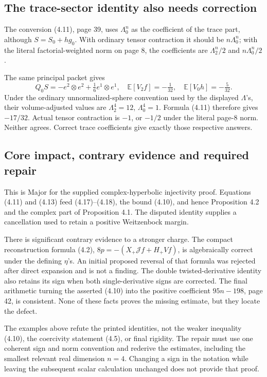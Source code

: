 \documentclass[10pt]{article}
\begin{document}
\subsection*{The trace-sector identity also needs correction}
The conversion (4.11), page 39, uses \(\Lambda_0^n\) as the coefficient of the trace part, although \(S=S_0+hg_0\). With ordinary tensor contraction it should be \(n\Lambda_0^n\); with the literal factorial-weighted norm on page 8, the coefficients are \(\Lambda_2^n/2\) and \(n\Lambda_0^n/2\).\par
The same principal packet gives \[Q_0S=-e^2\otimes e^2+\tfrac16e^1\otimes e^1,\quad
 \mathbb E[V_2f]=-\tfrac1{32},\quad
 \mathbb E[V_0h]=-\tfrac5{32}.\] Under the ordinary unnormalized-sphere convention used by the displayed \(\Lambda\)’s, their volume-adjusted values are \(\Lambda_2^4=12\), \(\Lambda_0^4=1\). Formula (4.11) therefore gives \(-17/32\). Actual tensor contraction is \(-1\), or \(-1/2\) under the literal page-8 norm. Neither agrees. Correct trace coefficients give exactly those respective answers.\par
\subsection*{Core impact, contrary evidence and required repair}
This is Major for the supplied complex-hyperbolic injectivity proof. Equations (4.11) and (4.13) feed (4.17)–(4.18), the bound (4.10), and hence Proposition 4.2 and the complex part of Proposition 4.1. The disputed identity supplies a cancellation used to retain a positive Weitzenbock margin.\par
There is significant contrary evidence to a stronger charge. The compact reconstruction formula (4.2), \(8p=-(X_+\mathcal Jf+H_+Vf)\), is algebraically correct under the defining \(\eta\)’s. An initial proposed reversal of that formula was rejected after direct expansion and is not a finding. The double twisted-derivative identity also retains its sign when both single-derivative signs are corrected. The final arithmetic turning the asserted (4.10) into the positive coefficient \(95n-198\), page 42, is consistent. None of these facts proves the missing estimate, but they locate the defect.\par
The examples above refute the printed identities, not the weaker inequality (4.10), the coercivity statement (4.5), or final rigidity. The repair must use one coherent sign and norm convention and rederive the estimates, including the smallest relevant real dimension \(n=4\). Changing a sign in the notation while leaving the subsequent scalar calculation unchanged does not provide that proof.\par
\end{document}
